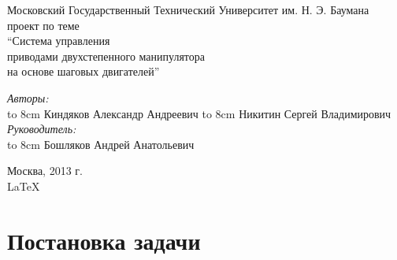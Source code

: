 \documentclass{article}
\begin{document}
\begin{titlepage}
\begin{center}
    {\large Московский Государственный Технический Университет им. Н. Э. Баумана}
    \\[50mm]
    { проект по теме}
    \\[7mm]
    {\LARGE ``Система управления \\ приводами двухстепенного манипулятора \\ на основе шаговых двигателей''}
    \\[37mm]

    \begin{flushright}
        \begin{minipage}{0.5\textwidth}
            \begin{flushleft}
                \textit{Авторы:} \\
                \hbox to 8cm {Киндяков Александр Андреевич \hfil \underline{\hspace{2cm} } }
                \vspace{\baselineskip}
                \hbox to 8cm {Никитин Сергей Владимирович \hfil \underline{\hspace{2cm} } }
                \vspace{2cm}
                \textit{Руководитель:} \\
                \hbox to 8cm {Бошляков Андрей Анатольевич \hfil \underline{\hspace{2cm} } }
            \end{flushleft}
        \end{minipage}
    \end{flushright}

    \vfill %
    Москва, 2013 г. \\
    \LaTeX
\end{center}
\end{titlepage}

\tableofcontents
\newpage



\newpage
\section{Постановка задачи}

\newpage






\newpage
\end{document}
